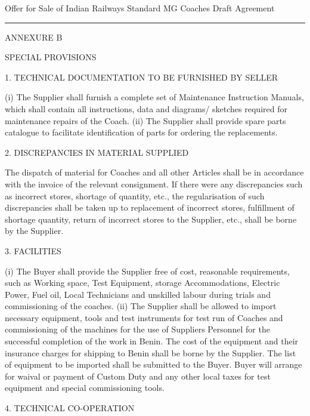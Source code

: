 \documentclass[12pt]{book}  %
\begin{document}
\begin{center}
{\Large Offer for Sale of Indian Railways Standard MG Coaches Draft Agreement}
\end{center}

\hrule height .1mm

\vspace{.5cm}



\newpage




ANNEXURE B

SPECIAL PROVISIONS


1.	TECHNICAL DOCUMENTATION TO BE FURNISHED BY SELLER

(i) The Supplier shall furnish a complete set of Maintenance Instruction Manuals, which shall contain all instructions, data and diagrams/ sketches required for maintenance repairs of the Coach. 
(ii) The Supplier shall provide spare parts catalogue to facilitate identification of parts for ordering the replacements. 

2.	DISCREPANCIES IN MATERIAL SUPPLIED

The dispatch of material for Coaches and all other Articles shall be in accordance with the invoice of the relevant consignment. If there were any discrepancies such as incorrect stores, shortage of quantity, etc., the regularisation of such discrepancies shall be taken up to replacement of incorrect stores, fulfillment of shortage quantity, return of incorrect stores to the Supplier, etc., shall be borne by the Supplier.

3.	FACILITIES

(i) 	The Buyer shall provide the Supplier free of cost, reasonable requirements, such as Working space, Test Equipment, storage Accommodations, Electric Power, Fuel oil, Local Technicians and unskilled labour during trials and commissioning of the coaches.
(ii)	The Supplier shall be allowed to import necessary equipment, tools and test instruments for test run of Coaches and commissioning of the machines for the use of Suppliers Personnel for the successful completion of the work in Benin. The cost of the equipment and their insurance charges for shipping to Benin shall be borne by the Supplier. The list of equipment to be imported shall be submitted to the Buyer. Buyer will arrange for waival or payment of Custom Duty and any other local taxes for test equipment and special commissioning tools.

4.	TECHNICAL CO-OPERATION
\end{document}
